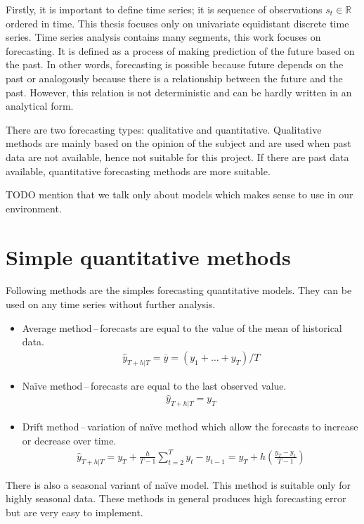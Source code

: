 Firstly, it is important to define time series; it is sequence of observations
$s_t \in \mathbb{R}$ ordered in time. This thesis focuses only on univariate equidistant 
discrete time series. Time series analysis contains many segments, this work focuses on 
forecasting. It is defined as a process of making prediction of the future based 
on the past. In other words, forecasting is possible because  
future depends on the past or analogously because there is a relationship
between the future and the past. However, this relation is not deterministic and 
can be hardly written in an analytical form.

There are two forecasting types: qualitative and quantitative.
Qualitative methods are mainly based on the opinion of the subject and are used 
when past data are not available, hence not suitable for this project. 
If there are past data available, quantitative forecasting methods are more suitable. 

TODO mention that we talk only about models which makes sense to use in our environment.

    \section{Simple quantitative methods}
    Following methods are the simples forecasting quantitative models. They can be used on
    any time series without further analysis. 

    \begin{itemize}
        \item Average method\,--\,forecasts are equal to the value of the mean of
            historical data.
            \begin{eqnarray}
                \hat{y}_{T+h|T} = \overline{y} = (y_{1}+ \dots + y_{T}) / T 
            \end{eqnarray}
        \item Na\"{i}ve method\,--\,forecasts are equal to the last observed value.
            \begin{eqnarray}
                \hat{y}_{T+h|T} = y_{T}
            \end{eqnarray}
        \item Drift method\,--\,variation of na\"{i}ve method which allow the
            forecasts to increase or decrease over time.
            \begin{eqnarray}
                \hat{y}_{T+h|T} = y_{T} + \frac{h}{T-1} \sum_{t=2}^T{y_{t} - y_{t-1}} = 
                    y_{T} + h(\frac{y_{T}-y_{1}}{T-1}) 
            \end{eqnarray}

    \end{itemize}
    There is also a seasonal variant of na\"{i}ve model. This method is suitable only
    for highly seasonal data. These methods in general produces high forecasting error 
    but are very easy to implement.

